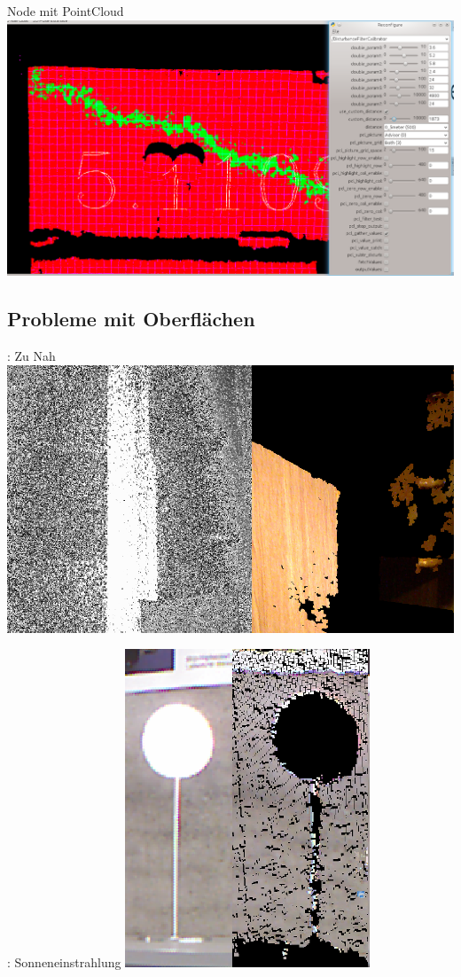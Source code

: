\documentclass{VLKlauck}
\begin{document}
	\begin{frame}{Node mit PointCloud}
		\includegraphics[scale=0.35]{disturbance_filter_calibrator1.png}	
	\end{frame}
	
	
	\subsection{Probleme mit Oberflächen}
		
	\begin{frame}{\insertsubsection: Zu Nah}	
		\includegraphics[scale=0.6]{ToClose.png}
	\end{frame}
			
	\begin{frame}{\insertsubsection: Sonneneinstrahlung}	
		\includegraphics[scale=1.2]{Sun.png}
	\end{frame}
			
\end{document}
